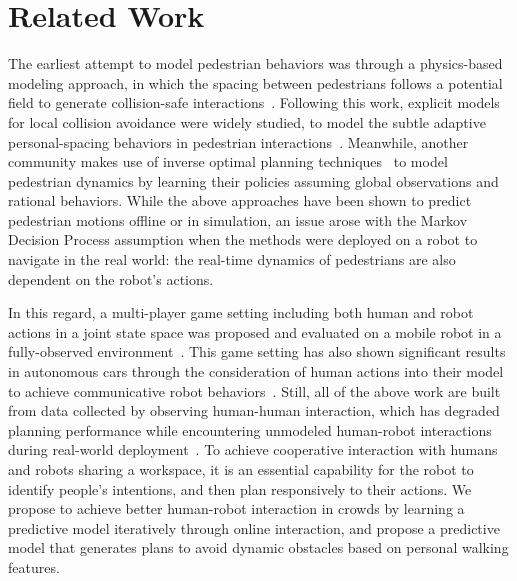 \documentclass[conference]{IEEEtran}
\begin{document}
\section{Related Work}
\label{sec:related}
\vspace{-0.4em}
The earliest attempt to model pedestrian behaviors was through a physics-based 
modeling approach, in which the spacing between pedestrians follows a 
potential field to generate collision-safe 
interactions~\cite{helbing1995social}. Following this work, explicit models 
for local collision avoidance were widely studied, to model the subtle 
adaptive personal-spacing behaviors in pedestrian 
interactions~\cite{papadakis2014adaptive}. Meanwhile, another community 
makes use of inverse optimal planning 
techniques~\cite{ziebart2009planning,henry2010learning,vasquez2014inverse} to 
model pedestrian dynamics by learning their policies assuming global observations and 
rational behaviors.
While the above approaches have been shown to predict pedestrian motions 
offline or in simulation, an issue arose with the Markov Decision 
Process assumption when the methods were deployed on a robot to navigate in the real world:
the real-time dynamics of pedestrians are also dependent on the robot's 
actions. 

In this regard, a multi-player game setting including both human and robot actions in a joint state space was proposed and evaluated on a mobile robot in a fully-observed environment~\cite{trautman2010unfreezing}. This game setting has also shown significant results in autonomous cars through the consideration of human actions into their model to achieve communicative robot behaviors~\cite{sadigh2016planning}.
Still, all of the above work are built from data collected by observing human-human 
interaction, which has degraded planning performance while encountering unmodeled 
human-robot interactions during real-world 
deployment~\cite{trautman2015robot, pfeiffer2016predicting}. To achieve 
cooperative interaction with humans and robots sharing a workspace, it is 
an essential capability for the robot to identify people's 
intentions, and then plan responsively to their actions. We propose to achieve 
better human-robot interaction in crowds by learning a predictive model 
iteratively through online interaction, and propose a predictive model 
that generates plans to avoid dynamic obstacles based on personal walking features. 
\vspace{-0.1em}
\end{document}
